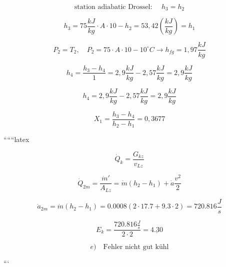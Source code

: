 \[
\text{station adiabatic Drossel: } \quad h_3 = h_2
\]

\[
h_3 = 75 \frac{kJ}{kg} \cdot A \cdot 10 - h_2 = 53,42 \left( \frac{kJ}{kg} \right) = h_1
\]

\[
P_2 = T_2, \quad P_2 = 75 \cdot A \cdot 10 - 10^\circ C \rightarrow h_{fg} = 1,97 \frac{kJ}{kg}
\]

\[
h_4 = \frac{h_3 - h_4}{1} = 2,9 \frac{kJ}{kg} - 2,57 \frac{kJ}{kg} = 2,9 \frac{kJ}{kg}
\]

\[
h_4 = 2,9 \frac{kJ}{kg} - 2,57 \frac{kJ}{kg} = 2,9 \frac{kJ}{kg}
\]

\[
X_1 = \frac{h_3 - h_4}{h_2 - h_1} = 0,3677
\]

``````latex

\[
\dot{Q}_k = \frac{G_{kz}}{v_{Lz}}
\]

\[
\dot{Q}_{2m} = \frac{\dot{m}'}{A_{Lz}} = \dot{m}(h_2 - h_1) + \dot{a} \frac{v^2}{2}
\]

\[
\dot{a}_{2m} = \dot{m}(h_2 - h_1) = 0.0008 \left(2 \cdot 17.7 + 9.3 \cdot 2 \right) = 720.816 \frac{J}{s}
\]

\[
E_k = \frac{720.816 \frac{J}{s}}{2 \cdot 2} = \underline{4.30}
\]

\[
e) \quad \text{Fehler nicht gut k\"uhl}
\]

```